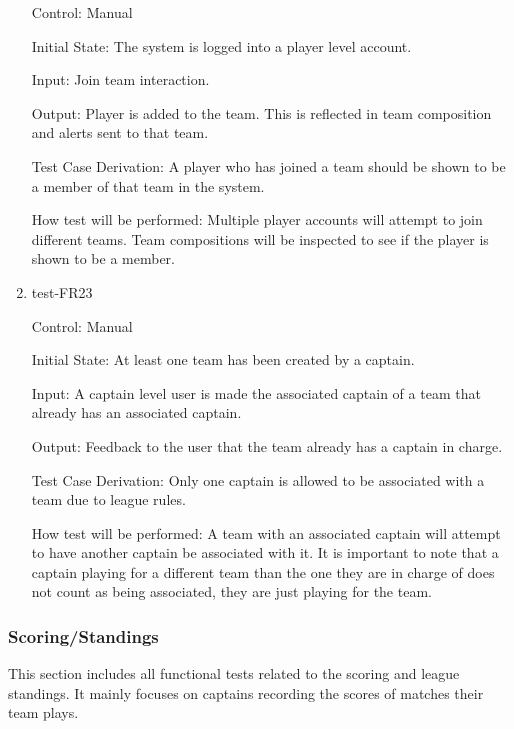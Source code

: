 \documentclass[12pt, titlepage]{article}
\begin{document}
\begin{enumerate}
  Control: Manual

  Initial State: The system is logged into a player level account.

  Input: Join team interaction.

  Output: Player is added to the team. This is reflected in team composition
  and alerts sent to that team.

  Test Case Derivation: A player who has joined a team should be shown to be a
  member of that team in the system.

  How test will be performed: Multiple player accounts will attempt to join 
  different teams. Team compositions will be inspected to see if the player
  is shown to be a member. 

  \item{test-FR23\\}

  Control: Manual

  Initial State: At least one team has been created by a captain.

  Input: A captain level user is made the associated captain of a team that
  already has an associated captain.

  Output: Feedback to the user that the team already has a captain in charge.

  Test Case Derivation: Only one captain is allowed to be associated with a
  team due to league rules.

  How test will be performed: A team with an associated captain will attempt
  to have another captain be associated with it. It is important to note that
  a captain playing for a different team than the one they are in charge of
  does not count as being associated, they are just playing for the team.

\end{enumerate}

\subsubsection{Scoring/Standings}

This section includes all functional tests related to the scoring and
league standings. It mainly focuses on captains recording the scores of
matches their team plays.
\end{document}
